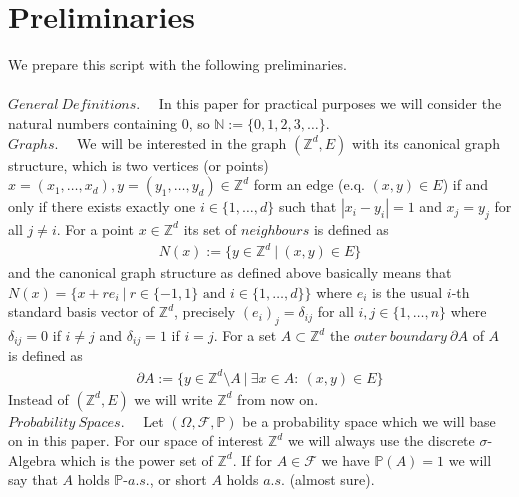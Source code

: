 \documentclass[12pt,a4paper]{scrartcl}
\numberwithin{equation}{section}
\numberwithin{equation}{section}
\theoremstyle{definition}
\begin{document}
\newpage


\section{Preliminaries} \label{prelim}

We prepare this script with the following preliminaries. \\
\\
\noindent $\boldsymbol{\mathit{General\ Definitions}}.\quad$ In this paper for practical purposes we will consider the natural numbers containing 0, so $\mathbb{N} := \{0, 1, 2, 3, \dots\}$. 
\\

\noindent $\boldsymbol{\mathit{Graphs}}.\quad$ We will be interested in the graph $(\mathbb{Z}^d, E)$ with its canonical graph structure, which is two vertices (or points) $x=(x_1,\dots,x_d),y=(y_1,\dots,y_d)\in \mathbb{Z}^d$ form an edge (e.q. $(x,y)\in E$) if and only if there exists exactly one $i\in \{1,\dots, d\}$ such that $|x_i - y_i| = 1$ and $x_j = y_j$ for all $j\neq i$. For a point $x\in \mathbb{Z}^d$ its set of $\mathit{neighbours}$ is defined as 
\begin{align*}
	N(x) := \{y\in \mathbb{Z}^d\ |\ (x,y)\in E\}
\end{align*}
and the canonical graph structure as defined above basically means that $N(x) = \{x+re_i\ |\ r\in \{-1,1\}\text{ and } i\in \{1,\dots, d\}\}$ where $e_i$ is the usual $i$-th standard basis vector of $\mathbb{Z}^d$, precisely $(e_i)_j=\delta_{ij}$ for all $i,j\in \{1, \dots , n \}$ where $\delta_{ij}=0$ if $i\neq j$ and $\delta_{ij}=1$ if $i=j$. For a set $A\subset \mathbb{Z}^d$ the $\mathit{outer\ boundary}\ \partial A$ of $A$ is defined as 
\begin{align*}
	\partial A := \{y\in \mathbb{Z}^d\setminus A\ |\ \exists x\in A:\ (x,y)\in E\}
\end{align*}
Instead of $(\mathbb{Z}^d, E)$ we will write $\mathbb{Z}^d$ from now on. 
\\

\noindent $\boldsymbol{\mathit{Probability\ Spaces}}.\quad$ Let $(\Omega,\mathcal{F}, \mathbb{P})$ be a probability space which we will base on in this paper. For our space of interest $\mathbb{Z}^d$ we will always use the discrete $\sigma$-Algebra which is the power set of $\mathbb{Z}^d$. If for $A\in \mathcal{F}$ we have $\mathbb{P}(A)=1$ we will say that $A$ holds $\mathbb{P}$-$a.s.$, or short $A$ holds $a.s.$ (almost sure).
\\
\end{document}
